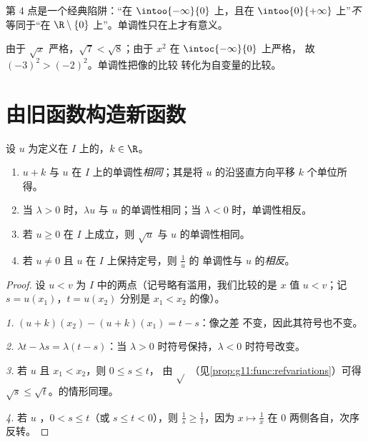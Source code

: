 \begin{remark}
第 4 点是一个经典陷阱：“在 $\intoo{-\infty}{0}$ 上，且在
$\intoo{0}{+\infty}$ 上”\emph{不}等同于“在
$\R \setminus \{0\}$ 上”。单调性只在上才有意义。
\end{remark}

\begin{example}[不计算而比较大小]
由于 $\sqrt x$ 严格，$\sqrt{7} < \sqrt{8}$；由于
$x^2$ 在 $\intoc{-\infty}{0}$ 上严格，
故 $(-3)^2 > (-2)^2$。单调性把像的比较
转化为自变量的比较。
\end{example}

\section{由旧函数构造新函数}

\begin{proposition}[变换]\label{prop:g11:func:transforms}
设 $u$ 为定义在 $I$ 上的，$k \in \R$。
\begin{enumerate}
  \item $u + k$ 与 $u$ 在 $I$ 上的单调性\emph{相同}；其是将
        $u$ 的沿竖直方向平移 $k$ 个单位所得。
  \item 当 $\lambda > 0$ 时，$\lambda u$ 与 $u$ 的单调性相同；当
        $\lambda < 0$ 时，单调性相反。
  \item 若 $u \geq 0$ 在 $I$ 上成立，则 $\sqrt u$ 与
        $u$ 的单调性相同。
  \item 若 $u \neq 0$ 且 $u$ 在 $I$ 上保持定号，则 $\frac1u$ 的
        单调性与 $u$ 的\emph{相反}。
\end{enumerate}
\end{proposition}

\begin{proof}
设 $u < v$ 为 $I$ 中的两点（记号略有滥用，我们比较的是 $x$ 值 $u < v$；记
$s = u(x_1)$，$t = u(x_2)$ 分别是 $x_1 < x_2$ 的像）。

\emph{1.} $(u+k)(x_2) - (u+k)(x_1) = t - s$：像之差
不变，因此其符号也不变。

\emph{2.} $\lambda t - \lambda s = \lambda(t - s)$：当
$\lambda > 0$ 时符号保持，$\lambda < 0$ 时符号改变。

\emph{3.} 若 $u$ 且 $x_1 < x_2$，则 $0 \leq s \leq t$，
由 $\sqrt{}$ （见\cref{prop:g11:func:refvariations}）可得
$\sqrt s \leq \sqrt t$。的情形同理。

\emph{4.} 若 $u$ ，$0 < s \leq t$（或 $s \leq t < 0$），则
$\frac1s \geq \frac1t$，因为 $x \mapsto \frac1x$ 在
$0$ 两侧各自，次序反转。
\end{proof}

